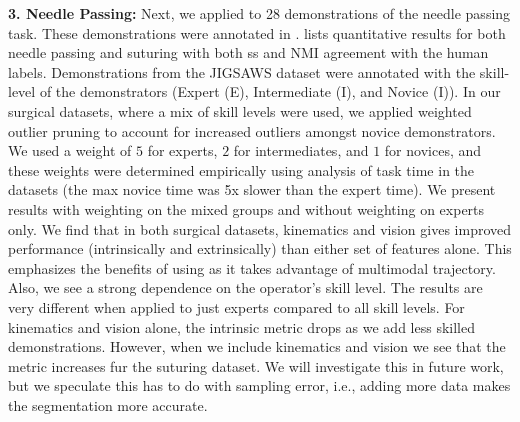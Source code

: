 \documentclass[0-main.tex]{subfiles}
\begin{document}
\vspace{0.25em}
\noindent\textbf{3. Needle Passing: } Next, we applied \tsc to 28 demonstrations of the needle passing task.
These demonstrations were annotated in \cite{gao2014jigsaws}. 
 lists quantitative results for both needle passing and suturing with both \textsf{ss} and NMI agreement with the human labels.
Demonstrations from the JIGSAWS dataset were annotated with the skill-level of the demonstrators (Expert (E), Intermediate (I), and Novice (I)).
In our surgical datasets, where a mix of skill levels were used, we applied weighted outlier pruning to account for increased outliers amongst novice demonstrators.
We used a weight of $5$ for experts, $2$ for intermediates, and $1$ for novices, and these weights were determined empirically using analysis of task time in the datasets (the max novice time was 5x slower than the expert time).
We present results with weighting on the mixed groups and without weighting on experts only.
We find that in both surgical datasets, kinematics and vision gives improved performance (intrinsically and extrinsically) than either set of features alone.
This emphasizes the benefits of using \tsc as it takes advantage of multimodal trajectory.
Also, we see a strong dependence on the operator's skill level.
The results are very different when applied to just experts compared to all skill levels.
For kinematics and vision alone, the intrinsic metric drops as we add less skilled demonstrations.
However, when we include kinematics and vision we see that the metric increases fur the suturing dataset.
We will investigate this in future work, but we speculate this has to do with sampling error, i.e., adding more data makes the segmentation more accurate.




\end{document}
